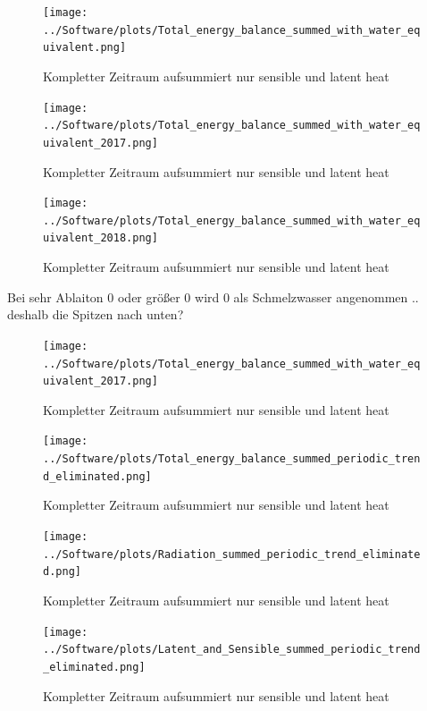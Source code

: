 \documentclass[12pt,a4paper]{article}
\begin{document}
\begin{figure}[H]
\centering
\texttt{[image: ../Software/plots/Total\_energy\_balance\_summed\_with\_water\_equivalent.png]}
\caption{Kompletter Zeitraum aufsummiert nur sensible und latent heat}
\label{fig:..}
\end{figure}


\begin{figure}[H]
\centering
\texttt{[image: ../Software/plots/Total\_energy\_balance\_summed\_with\_water\_equivalent\_2017.png]}
\caption{Kompletter Zeitraum aufsummiert nur sensible und latent heat}
\label{fig:..}
\end{figure}

\begin{figure}[H]
\centering
\texttt{[image: ../Software/plots/Total\_energy\_balance\_summed\_with\_water\_equivalent\_2018.png]}
\caption{Kompletter Zeitraum aufsummiert nur sensible und latent heat}
\label{fig:..}
\end{figure}


Bei sehr Ablaiton 0 oder größer 0 wird 0 als Schmelzwasser angenommen  .. deshalb die Spitzen nach unten?

\begin{figure}[H]
\centering
\texttt{[image: ../Software/plots/Total\_energy\_balance\_summed\_with\_water\_equivalent\_2017.png]}
\caption{Kompletter Zeitraum aufsummiert nur sensible und latent heat}
\label{fig:..}
\end{figure}




\begin{figure}[H]
\centering
\texttt{[image: ../Software/plots/Total\_energy\_balance\_summed\_periodic\_trend\_eliminated.png]}
\caption{Kompletter Zeitraum aufsummiert nur sensible und latent heat}
\label{fig:..}
\end{figure}

\begin{figure}[H]
\centering
\texttt{[image: ../Software/plots/Radiation\_summed\_periodic\_trend\_eliminated.png]}
\caption{Kompletter Zeitraum aufsummiert nur sensible und latent heat}
\label{fig:..}
\end{figure}

\begin{figure}[H]
\centering
\texttt{[image: ../Software/plots/Latent\_and\_Sensible\_summed\_periodic\_trend\_eliminated.png]}
\caption{Kompletter Zeitraum aufsummiert nur sensible und latent heat}
\label{fig:..}
\end{figure}
\end{document}
